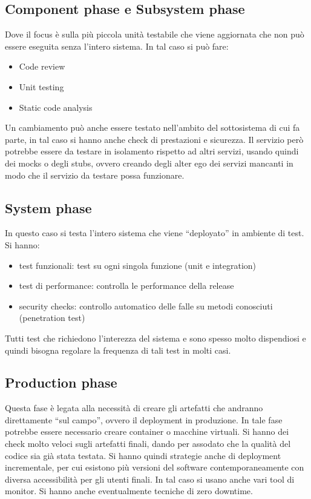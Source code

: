 \subsection{Component phase e Subsystem phase}
Dove il focus è sulla più piccola unità testabile che viene aggiornata che non
può essere eseguita senza l'intero sistema. In tal caso si può fare:
\begin{itemize}
      \item Code review
      \item Unit testing
      \item Static code analysis
\end{itemize}
Un cambiamento può anche essere testato nell'ambito del sottosistema di cui fa
parte, in tal caso si hanno anche check di prestazioni e sicurezza. Il servizio
però potrebbe essere da testare in isolamento rispetto ad altri servizi, usando
quindi dei mocks o degli stubs, ovvero creando degli alter ego dei servizi mancanti
in modo che il servizio da testare possa funzionare.
\subsection{System phase}
In questo caso si testa l'intero sistema che viene “deployato” in ambiente di test.
Si hanno:
\begin{itemize}
	\item test funzionali: test su ogni singola funzione (unit e integration)
	\item test di performance: controlla le performance della release 
	\item security checks: controllo automatico delle falle su metodi conosciuti
      (penetration test)
\end{itemize}
Tutti test che richiedono l'interezza del sistema e sono spesso molto dispendiosi e
quindi bisogna regolare la frequenza di tali test in molti casi.
\subsection{Production phase}
Questa fase è legata alla necessità di creare gli artefatti che andranno
direttamente “sul campo”, ovvero il deployment in produzione. In tale fase potrebbe
essere necessario creare container o macchine virtuali. Si hanno dei check molto
veloci sugli artefatti finali, dando per assodato che la qualità del codice sia già
stata testata. Si hanno quindi strategie anche di deployment incrementale, per
cui esistono più versioni del software contemporaneamente con diversa accessibilità
per gli utenti finali. In tal caso si usano anche vari tool di monitor. Si hanno
anche eventualmente tecniche di zero downtime.

